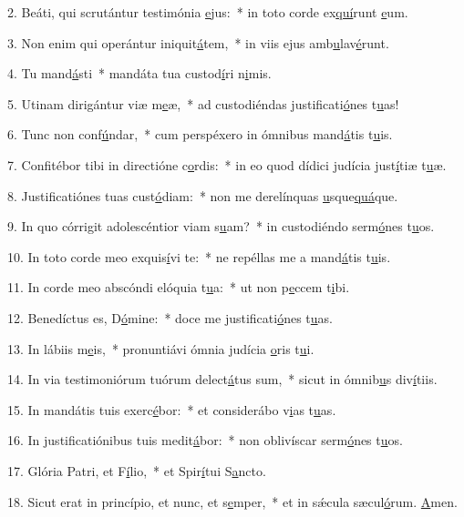 2. Beáti, qui scrutántur testimónia \uline{e}jus:~* in toto corde ex\uline{quí}runt \uline{e}um.\par 
3. Non enim qui operántur iniquit\uline{á}tem,~* in viis ejus amb\uline{u}lav\uline{é}runt.\par 
4. Tu mand\uline{á}sti~* mandáta tua custod\uline{í}ri n\uline{i}mis.\par 
5. Utinam dirigántur viæ m\uline{e}æ,~* ad custodiéndas justificati\uline{ó}nes t\uline{u}as!\par 
6. Tunc non conf\uline{ú}ndar,~* cum perspéxero in ómnibus mand\uline{á}tis t\uline{u}is.\par 
7. Confitébor tibi in directióne c\uline{o}rdis:~* in eo quod dídici judícia just\uline{í}tiæ t\uline{u}æ.\par 
8. Justificatiónes tuas cust\uline{ó}diam:~* non me derelínquas \uline{u}sque\uline{quá}que.\par 
9. In quo córrigit adolescéntior viam s\uline{u}am?~* in custodiéndo serm\uline{ó}nes t\uline{u}os.\par 
10. In toto corde meo exquis\uline{í}vi te:~* ne repéllas me a mand\uline{á}tis t\uline{u}is.\par 
11. In corde meo abscóndi elóquia t\uline{u}a:~* ut non p\uline{e}ccem t\uline{i}bi.\par 
12. Benedíctus es, D\uline{ó}mine:~* doce me justificati\uline{ó}nes t\uline{u}as.\par 
13. In lábiis m\uline{e}is,~* pronuntiávi ómnia judícia \uline{o}ris t\uline{u}i.\par 
14. In via testimoniórum tuórum delect\uline{á}tus sum,~* sicut in ómnib\uline{u}s div\uline{í}tiis.\par 
15. In mandátis tuis exerc\uline{é}bor:~* et considerábo v\uline{i}as t\uline{u}as.\par 
16. In justificatiónibus tuis medit\uline{á}bor:~* non oblivíscar serm\uline{ó}nes t\uline{u}os.\par 
17. Glória Patri, et F\uline{í}lio,~* et Spir\uline{í}tui S\uline{a}ncto.\par 
18. Sicut erat in princípio, et nunc, et s\uline{e}mper,~* et in sǽcula sæcul\uline{ó}rum. \uline{A}men.\par 
